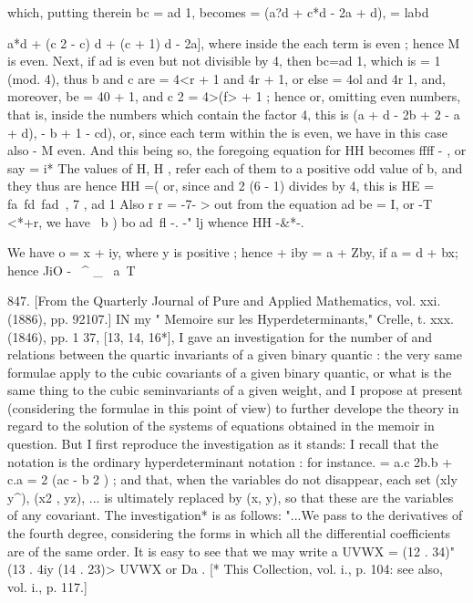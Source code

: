 \documentclass[11pt,a4paper]{book}
\begin{document}
{which, putting therein bc = ad 1, becomes = \abd (a?d + c*d - 2a + d), = labd {a*d + (c 2 - c) d + (c + 1) d - 2a], where inside the { } each term is even ; hence M is even. Next, if ad is even but not divisible by 4, then bc=ad 1, which is = 1 (mod. 4), thus b and c are = 4<r + 1 and 4r + 1, or else = 4ol and 4r 1, and, moreover, be = 40 + 1, and c 2 = 4>(f> + 1 ; hence or, omitting even numbers, that is, inside the { } numbers which contain the factor 4, this is (a + d - 2b + 2 - a + d), - b + 1 - cd), or, since each term within the { } is even, we have in this case also - M even. And this being so, the foregoing equation for HH becomes ffff - , or say = i* The values of H, H , refer each of them to a positive odd value of b, and they thus are hence HH =( or, since and 2 (6 - 1) divides by 4, this is HE = fa\ fd\ fad\ , 7 , ad 1 Also r r = -7- > out from the equation ad be = I, or -T~ <*+r, we have \bj \bj \ b ) bo ad\ fl -. -" lj whence HH -&*-.

We have o = x + iy, where y is positive ; hence + iby = a + Zby, if a = d + bx; hence JiO - ~^ _ ~a~T%

847. [From the Quarterly Journal of Pure and Applied Mathematics, vol. xxi. (1886), pp. 92107.] IN my " Memoire sur les Hyperdeterminants," Crelle, t. xxx. (1846), pp. 1 37, [13, 14, 16*], I gave an investigation for the number of and relations between the quartic invariants of a given binary quantic : the very same formulae apply to the cubic covariants of a given binary quantic, or what is the same thing to the cubic seminvariants of a given weight, and I propose at present (considering the formulae in this point of view) to further develope the theory in regard to the solution of the systems of equations obtained in the memoir in question. But I first reproduce the investigation as it stands: I recall that the notation is the ordinary hyperdeterminant notation : for instance. = a.c 2b.b + c.a = 2 (ac - b 2 ) ; and that, when the variables do not disappear, each set (xly y^), (x2 , yz), ... is ultimately replaced by (x, y), so that these are the variables of any covariant. The investigation* is as follows: "...We pass to the derivatives of the fourth degree, considering the forms in which all the differential coefficients are of the same order. It is easy to see that we may write a UVWX = (12 . 34)" (13 . 4iy (14 . 23)> UVWX or Da . [* This Collection, vol. i., p. 104: see also, vol. i., p. 117.]

}}
\end{document}
